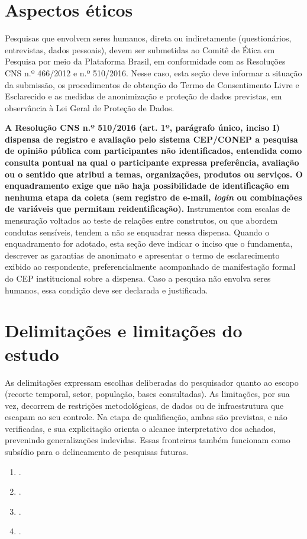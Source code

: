 \section{Aspectos éticos}
\label{sec:aspectos_eticos}
Pesquisas que envolvem seres humanos, direta ou indiretamente (questionários, entrevistas, dados pessoais), devem ser submetidas ao Comitê de Ética em Pesquisa por meio da Plataforma Brasil, em conformidade com as Resoluções CNS n.º 466/2012 e n.º 510/2016. Nesse caso, esta seção deve informar a situação da submissão, os procedimentos de obtenção do Termo de Consentimento Livre e Esclarecido e as medidas de anonimização e proteção de dados previstas, em observância à Lei Geral de Proteção de Dados.

\textbf{A Resolução CNS n.º 510/2016 (art. 1º, parágrafo único, inciso I) dispensa de registro e avaliação pelo sistema CEP/CONEP a pesquisa de opinião pública com participantes não identificados, entendida como consulta pontual na qual o participante expressa preferência, avaliação ou o sentido que atribui a temas, organizações, produtos ou serviços. O enquadramento exige que não haja possibilidade de identificação em nenhuma etapa da coleta (sem registro de e-mail, \textit{login} ou combinações de variáveis que permitam reidentificação).} Instrumentos com escalas de mensuração voltados ao teste de relações entre construtos, ou que abordem condutas sensíveis, tendem a não se enquadrar nessa dispensa. Quando o enquadramento for adotado, esta seção deve indicar o inciso que o fundamenta, descrever as garantias de anonimato e apresentar o termo de esclarecimento exibido ao respondente, preferencialmente acompanhado de manifestação formal do CEP institucional sobre a dispensa. Caso a pesquisa não envolva seres humanos, essa condição deve ser declarada e justificada.

\section{Delimitações e limitações do estudo}
\label{sec:limitacoes}
As delimitações expressam escolhas deliberadas do pesquisador quanto ao escopo (recorte temporal, setor, população, bases consultadas). As limitações, por sua vez, decorrem de restrições metodológicas, de dados ou de infraestrutura que escapam ao seu controle. Na etapa de qualificação, ambas são previstas, e não verificadas, e sua explicitação orienta o alcance interpretativo dos achados, prevenindo generalizações indevidas. Essas fronteiras também funcionam como subsídio para o delineamento de pesquisas futuras.

\begin{enumerate}
  \item {}.
  \item {}.
  \item {}.
  \item {}.
\end{enumerate}